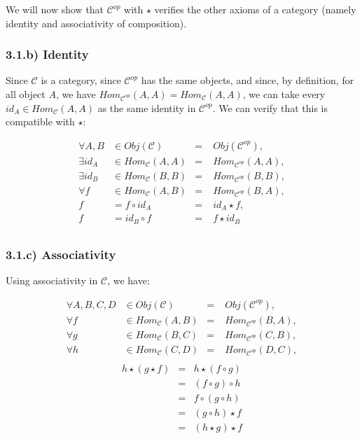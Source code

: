 \documentclass[12pt, letterpaper, twoside]{report}
\begin{document}
We will now show that $\mathcal{C}^{op}$ with $\star$ verifies the other axioms of a category (namely identity and associativity of composition).

\subsubsection*{3.1.b) Identity}

Since $\mathcal{C}$ is a category, since $\mathcal{C}^{op}$ has the same objects, and since, by definition, for all object $A$, we have $Hom_{\mathcal{C}^{op}} (A, A) = Hom_{\mathcal{C}} (A, A)$, we can take every $id_A \in Hom_{\mathcal{C}}(A, A)$ as the same identity in $\mathcal{C}^{op}$. We can verify that this is compatible with $\star$:

$$
\begin{aligned}
	\forall A, B & \in Obj (\mathcal{C})        &=& \;  Obj (\mathcal{C}^{op})        , \\
	\exists id_A & \in Hom_{\mathcal{C}} (A, A) &=& \;  Hom_{\mathcal{C}^{op}} (A, A) , \\
	\exists id_B & \in Hom_{\mathcal{C}} (B, B) &=& \;  Hom_{\mathcal{C}^{op}} (B, B) , \\
	\forall f    & \in Hom_{\mathcal{C}} (A, B) &=& \;  Hom_{\mathcal{C}^{op}} (B, A) , \\
	f            & =   f    \circ id_A          &=& \;  id_A \star f                  , \\
	f            & =   id_B \circ    f          &=& \;  f    \star id_B                 \\
\end{aligned}
$$

\subsubsection*{3.1.c) Associativity}

Using associativity in $\mathcal{C}$, we have:

$$
\begin{aligned}
	\forall A, B, C, D & \in Obj (\mathcal{C})        &=& \;  Obj (\mathcal{C}^{op})        , \\
	\forall f          & \in Hom_{\mathcal{C}} (A, B) &=& \;  Hom_{\mathcal{C}^{op}} (B, A) , \\
	\forall g          & \in Hom_{\mathcal{C}} (B, C) &=& \;  Hom_{\mathcal{C}^{op}} (C, B) , \\
	\forall h          & \in Hom_{\mathcal{C}} (C, D) &=& \;  Hom_{\mathcal{C}^{op}} (D, C) , \\
\end{aligned}
$$
$$
\begin{aligned}
	h \star (g \star f) &=&  h \star (f  \circ g) \\
						&=& (f \circ  g) \circ h  \\
						&=&  f \circ (g  \circ h) \\
						&=& (g \circ  h) \star f  \\
						&=& (h \star  g) \star f  \\
\end{aligned}
$$
\end{document}
